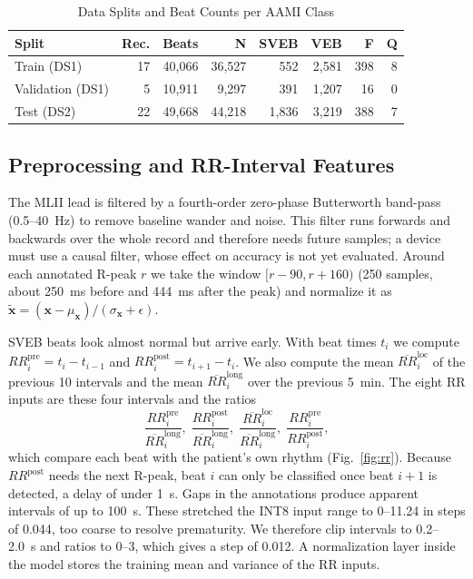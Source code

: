 \documentclass[conference]{IEEEtran}
\begin{document}
\begin{table}[t]
\caption{Data Splits and Beat Counts per AAMI Class}
\label{tab:data}
\centering
\footnotesize
\setlength{\tabcolsep}{2.6pt}
\begin{tabular}{@{}lrrrrrrr@{}}
\toprule
Split & Rec. & Beats & N & SVEB & VEB & F & Q \\
\midrule
Train (DS1) & 17 & 40,066 & 36,527 & 552 & 2,581 & 398 & 8 \\
Validation (DS1) & 5 & 10,911 & 9,297 & 391 & 1,207 & 16 & 0 \\
Test (DS2) & 22 & 49,668 & 44,218 & 1,836 & 3,219 & 388 & 7 \\
\bottomrule
\end{tabular}
\end{table}

\subsection{Preprocessing and RR-Interval Features}
The MLII lead is filtered by a fourth-order zero-phase Butterworth band-pass (0.5--40~Hz) to remove baseline wander and noise. This filter runs forwards and backwards over the whole record and therefore needs future samples; a device must use a causal filter, whose effect on accuracy is not yet evaluated. Around each annotated R-peak $r$ we take the window $[r-90, r+160)$ (250 samples, about 250~ms before and 444~ms after the peak) and normalize it as $\tilde{\mathbf{x}}=(\mathbf{x}-\mu_{\mathbf{x}})/(\sigma_{\mathbf{x}}+\epsilon)$.

SVEB beats look almost normal but arrive early. With beat times $t_i$ we compute $RR^{\mathrm{pre}}_i=t_i-t_{i-1}$ and $RR^{\mathrm{post}}_i=t_{i+1}-t_i$. We also compute the mean $\overline{RR}^{\mathrm{loc}}_i$ of the previous 10 intervals and the mean $\overline{RR}^{\mathrm{long}}_i$ over the previous 5~min. The eight RR inputs are these four intervals and the ratios
\begin{equation}
\frac{RR^{\mathrm{pre}}_i}{\overline{RR}^{\mathrm{long}}_i},\;
\frac{RR^{\mathrm{post}}_i}{\overline{RR}^{\mathrm{long}}_i},\;
\frac{\overline{RR}^{\mathrm{loc}}_i}{\overline{RR}^{\mathrm{long}}_i},\;
\frac{RR^{\mathrm{pre}}_i}{RR^{\mathrm{post}}_i},
\end{equation}
which compare each beat with the patient's own rhythm (Fig.~\ref{fig:rr}). Because $RR^{\mathrm{post}}$ needs the next R-peak, beat $i$ can only be classified once beat $i+1$ is detected, a delay of under 1~s. Gaps in the annotations produce apparent intervals of up to 100~s. These stretched the INT8 input range to 0--11.24 in steps of 0.044, too coarse to resolve prematurity. We therefore clip intervals to 0.2--2.0~s and ratios to 0--3, which gives a step of 0.012. A normalization layer inside the model stores the training mean and variance of the RR inputs.
\end{document}
